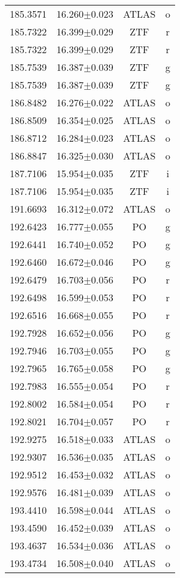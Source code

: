 \begin{table}
\begin{tabular}{cccc}
185.3571 & 16.260$\pm$0.023 & ATLAS & o \\
185.7322 & 16.399$\pm$0.029 & ZTF & r \\
185.7322 & 16.399$\pm$0.029 & ZTF & r \\
185.7539 & 16.387$\pm$0.039 & ZTF & g \\
185.7539 & 16.387$\pm$0.039 & ZTF & g \\
186.8482 & 16.276$\pm$0.022 & ATLAS & o \\
186.8509 & 16.354$\pm$0.025 & ATLAS & o \\
186.8712 & 16.284$\pm$0.023 & ATLAS & o \\
186.8847 & 16.325$\pm$0.030 & ATLAS & o \\
187.7106 & 15.954$\pm$0.035 & ZTF & i \\
187.7106 & 15.954$\pm$0.035 & ZTF & i \\
191.6693 & 16.312$\pm$0.072 & ATLAS & o \\
192.6423 & 16.777$\pm$0.055 & PO & g \\
192.6441 & 16.740$\pm$0.052 & PO & g \\
192.6460 & 16.672$\pm$0.046 & PO & g \\
192.6479 & 16.703$\pm$0.056 & PO & r \\
192.6498 & 16.599$\pm$0.053 & PO & r \\
192.6516 & 16.668$\pm$0.055 & PO & r \\
192.7928 & 16.652$\pm$0.056 & PO & g \\
192.7946 & 16.703$\pm$0.055 & PO & g \\
192.7965 & 16.765$\pm$0.058 & PO & g \\
192.7983 & 16.555$\pm$0.054 & PO & r \\
192.8002 & 16.584$\pm$0.054 & PO & r \\
192.8021 & 16.704$\pm$0.057 & PO & r \\
192.9275 & 16.518$\pm$0.033 & ATLAS & o \\
192.9307 & 16.536$\pm$0.035 & ATLAS & o \\
192.9512 & 16.453$\pm$0.032 & ATLAS & o \\
192.9576 & 16.481$\pm$0.039 & ATLAS & o \\
193.4410 & 16.598$\pm$0.044 & ATLAS & o \\
193.4590 & 16.452$\pm$0.039 & ATLAS & o \\
193.4637 & 16.534$\pm$0.036 & ATLAS & o \\
193.4734 & 16.508$\pm$0.040 & ATLAS & o \\

\end{tabular}
\end{table}
